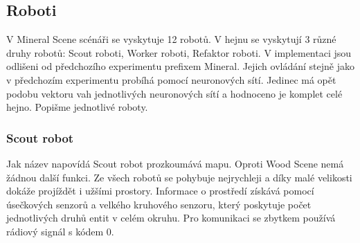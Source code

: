 \subsection{Roboti}
V Mineral Scene scénáři se vyskytuje 12 robotů. V hejnu se vyskytují 3 různé druhy robotů: Scout roboti, Worker roboti, Refaktor roboti. V implementaci jsou odlišeni od předchozího experimentu prefixem Mineral. Jejich ovládání stejně jako v předchozím experimentu probíhá pomocí neuronových sítí. Jedinec má opět podobu vektoru vah jednotlivých neuronových sítí a hodnoceno je komplet celé hejno. Popišme jednotlivé roboty.
\subsubsection{Scout robot}
Jak název napovídá Scout robot prozkoumává mapu. Oproti Wood Scene nemá žádnou další funkci. Ze všech robotů se pohybuje nejrychleji a díky malé velikosti dokáže projíždět i užšími prostory. Informace o prostředí získává pomocí úsečkových senzorů a velkého kruhového senzoru, který poskytuje počet jednotlivých druhů entit v celém okruhu. Pro komunikaci se zbytkem používá rádiový signál s kódem 0. 
\par  

